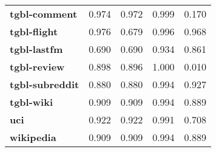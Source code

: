 \begin{tabular}{lrrrr}
\textbf{tgbl-comment}       & 0.974          & 0.972          & 0.999          & 0.170          \\
\textbf{tgbl-flight}        & 0.976          & 0.679          & 0.996          & 0.968          \\
\textbf{tgbl-lastfm}        & 0.690          & 0.690          & 0.934          & 0.861          \\
\textbf{tgbl-review}        & 0.898          & 0.896          & 1.000          & 0.010          \\
\textbf{tgbl-subreddit}     & 0.880          & 0.880          & 0.994          & 0.927          \\
\textbf{tgbl-wiki}          & 0.909          & 0.909          & 0.994          & 0.889          \\
\textbf{uci}                & 0.922          & 0.922          & 0.991          & 0.708          \\
\textbf{wikipedia}          & 0.909          & 0.909          & 0.994          & 0.889          \\
\bottomrule
\end{tabular}